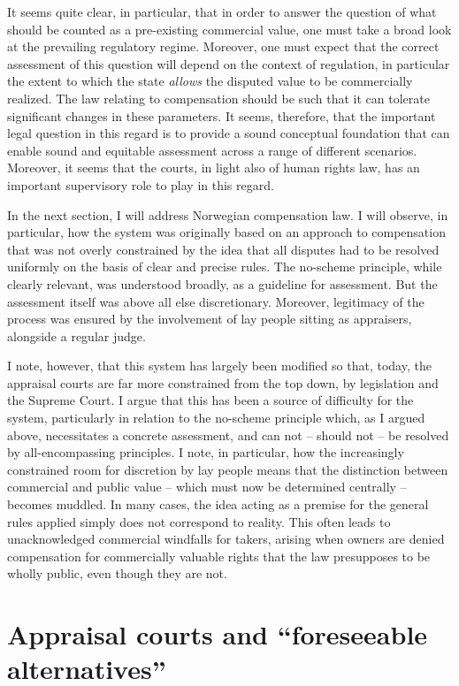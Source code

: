 It seems quite clear, in particular, that in order to answer the question of what should be counted as a pre-existing commercial value, one must take a broad look at the prevailing regulatory regime. Moreover, one must expect that the correct assessment of this question will depend on the context of regulation, in particular the extent to which the state \emph{allows} the disputed value to be commercially realized. The law relating to compensation should be such that it can tolerate significant changes in these parameters. It  seems, therefore, that the important legal question in this regard is to provide a sound conceptual foundation that can enable sound and equitable assessment across a range of different scenarios. Moreover, it seems that the courts, in light also of human rights law, has an important supervisory role to play in this regard.

In the next section, I will address Norwegian compensation law. I will observe, in particular, how the system was originally based on an approach to compensation that was not overly constrained by the idea that all disputes had to be resolved uniformly on the basis of clear and precise rules. The no-scheme principle, while clearly relevant, was understood broadly, as a guideline for assessment. But the assessment itself was above all else discretionary. Moreover, legitimacy of the process was ensured by the involvement of lay people sitting as appraisers, alongside a regular judge. 

I note, however, that this system has largely been modified so that, today, the appraisal courts are far more constrained from the top down, by legislation and the Supreme Court. I argue that this has been a source of difficulty for the system, particularly in relation to the no-scheme principle which, as I argued above, necessitates a concrete assessment, and can not -- should not -- be resolved by all-encompassing principles. I note, in particular, how the increasingly constrained room for discretion by lay people means that the distinction between commercial and public value -- which must now be determined centrally -- becomes muddled. In many cases, the idea acting as a premise for the general rules applied simply does not correspond to reality. This often leads to unacknowledged commercial windfalls for takers, arising when owners are denied compensation for commercially valuable rights that the law presupposes to be wholly public, even though they are not. 

\section{Appraisal courts and ``foreseeable alternatives''}

